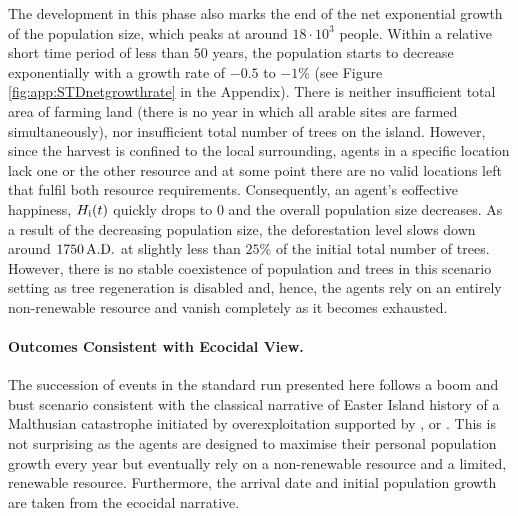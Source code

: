 The development in this phase also marks the end of the net exponential growth of the population size, which peaks at around $18\cdot 10^3$ people.
Within a relative short time period of less than $50$ years, the population starts to decrease exponentially with a growth rate of $-0.5$ to $-1\%$ (see Figure \ref{fig:app:STDnetgrowthrate} in the Appendix).
There is neither insufficient total area of farming land (there is no year in which all arable sites are farmed simultaneously), nor insufficient total number of trees on the island.
However, since the harvest is confined to the local surrounding, agents in a specific location lack one or the other resource and at some point there are no valid locations left that fulfil both resource requirements.
Consequently, an agent's eoffective happiness, $H_{\rm i}(t)$ quickly drops to $0$ and the overall population size decreases.
As a result of the decreasing population size, the deforestation level slows down around $1750\, {\rm A.D.}$ at slightly less than $25\%$ of the initial total number of trees. 
However, there is no stable coexistence of population and trees in this scenario setting as tree regeneration is disabled and, hence, the agents rely on an entirely non-renewable resource and vanish completely as it becomes exhausted.


\paragraph{Outcomes Consistent with Ecocidal View.}
The succession of events in the standard run presented here follows a boom and bust scenario consistent with the classical narrative of Easter Island history of a Malthusian catastrophe initiated by overexploitation supported by \citet{Brander1998}, \citet{Diamond2011} or \citet{Bahn2017}.
This is not surprising as the agents are designed to maximise their personal population growth every year but eventually rely on a non-renewable resource and a limited, renewable resource.
Furthermore, the arrival date and initial population growth are taken from the ecocidal narrative.



